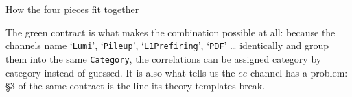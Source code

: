 \documentclass[aspectratio=169,9pt,t]{beamer}
\newcommand{\ee}{\ensuremath{ee}}
\begin{document}
\begin{frame}{How the four pieces fit together}
\begin{center}
\end{center}
\vspace{-3mm}
{\footnotesize The \textcolor{good!60!black}{green} contract is what makes the combination
possible at all: because the channels name `\texttt{Lumi}', `\texttt{Pileup}',
`\texttt{L1Prefiring}', `\texttt{PDF}' \ldots{} identically and group them into the same
\texttt{Category}, the correlations can be assigned category by category instead of guessed. It is
also what tells us the $\ee$ channel has a problem: \textcolor{warn}{\S3} of the same contract is
the line its theory templates break.}
\end{frame}
\end{document}
